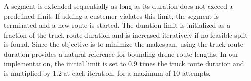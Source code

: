 \documentclass[3p, authoryear, 11pt]{elsarticle}
\newtheorem{remark}{Remark}
\begin{document}
A segment is extended sequentially as long as its duration does not exceed a predefined limit. If adding a customer violates this limit, the segment is terminated and a new route is started.
The duration limit is initialized as a fraction of the truck route duration and is increased iteratively if no feasible split is found. Since the objective is to minimize the makespan, using the truck route duration provides a natural reference for bounding drone route lengths. In our implementation, the initial limit is set to $0.9$ times the truck route duration and is multiplied by $1.2$ at each iteration, for a maximum of 10 attempts.





\end{document}
